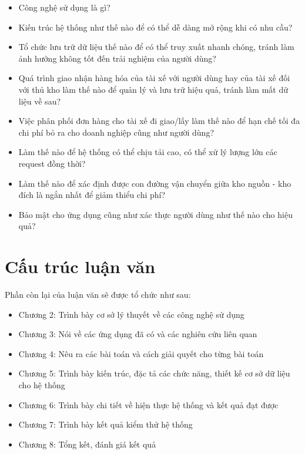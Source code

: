 	    \begin{itemize}
                \item Công nghệ sử dụng là gì?
                \item Kiến trúc hệ thống như thế nào để có thể dễ dàng mở rộng khi có nhu cầu?
                \item Tổ chức lưu trữ dữ liệu thế nào để có thể truy xuất nhanh chóng, tránh làm ảnh hưởng không tốt đến trải nghiệm của người dùng? 
                \item Quá trình giao nhận hàng hóa của tài xế với người dùng hay của tài xế đối với thủ kho làm thế nào để quản lý và lưu trữ hiệu quả, tránh làm mất dữ liệu về sau?
                \item Việc phân phối đơn hàng cho tài xế đi giao/lấy làm thế nào để hạn chế tối đa chi phí bỏ ra cho doanh nghiệp cũng như người dùng?
                \item Làm thế nào để hệ thống có thể chịu tải cao, có thể xử lý lượng lớn các request đồng thời? 
                \item Làm thế nào để xác định được con đường vận chuyển giữa kho nguồn - kho đích là ngắn nhất để giảm thiểu chi phí? 
                \item Bảo mật cho ứng dụng cũng như xác thực người dùng như thế nào cho hiệu quả?
            \end{itemize}
	    
	
	\section{Cấu trúc luận văn}
	 
	 Phần còn lại của luận văn sẽ được tổ chức như sau:
	 \begin{itemize}
                \item Chương 2: Trình bày cơ sở lý thuyết về các công nghệ sử dụng
                \item Chương 3: Nói về các ứng dụng đã có và các nghiên cứu liên quan
                \item Chương 4: Nêu ra các bài toán và cách giải quyết cho từng bài toán
                \item Chương 5: Trình bày kiến trúc, đặc tả các chức năng, thiết kế cơ sở dữ liệu cho hệ thống
                \item Chương 6: Trình bày chi tiết về hiện thực hệ thống và kết quả đạt được
                \item Chương 7: Trình bày kết quả kiểm thử hệ thống
                \item Chương 8: Tổng kết, đánh giá kết quả
            \end{itemize}